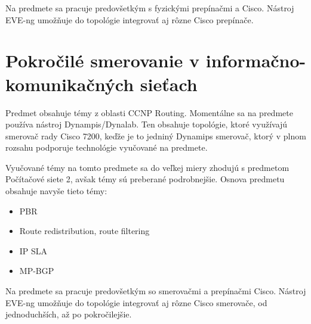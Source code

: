 Na predmete sa pracuje predovšetkým s fyzickými prepínačmi a Cisco. Nástroj EVE-ng umožňuje do topológie integrovať aj rôzne Cisco prepínače.





\section{Pokročilé smerovanie v informačno-komunikačných sieťach}

Predmet obsahuje témy z oblasti CCNP Routing. Momentálne sa na predmete používa nástroj Dynampis/Dynalab. Ten obsahuje topológie, ktoré využívajú smerovač rady Cisco 7200, keďže je to jedniný Dynamips smerovač, ktorý v plnom rozsahu podporuje technológie vyučované na predmete.

Vyučované témy na tomto predmete sa do veľkej miery zhodujú s predmetom Počítačové siete 2, avšak témy sú preberané podrobnejšie. Osnova predmetu obsahuje navyše tieto témy:

\begin{itemize}[noitemsep]
    \item PBR
    \item Route redistribution, route filtering
    \item IP SLA
    \item MP-BGP
\end{itemize}

Na predmete sa pracuje predovšetkým so smerovačmi a prepínačmi Cisco. Nástroj EVE-ng umožňuje do topológie integrovať aj rôzne Cisco smerovače, od jednoduchších, až po pokročilejšie.